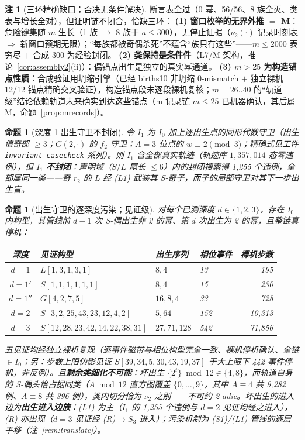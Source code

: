 \documentclass[11pt]{ctexart}
\newtheorem{proposition}[theorem]{命题}
\theoremstyle{definition}
\newtheorem{remark}[theorem]{注}
\newcommand{\vtwo}[1]{\nu_2(#1)}
\begin{document}
\begin{remark}[三环精确缺口；否决无条件解决]\label{rem:gaps}
断言表全过（0 幂、56/56、8 族全灭、类表与增长全对），但证明链不闭合，恰缺三环：
\textbf{(1) 窗口枚举的无界外推 $=$ M}：危险键集随 $m$ 生长（1 族 $\to$ 8 族于 $a\le300$），无停止证据（$\vtwo{\cdot}$-记录时刻表 $\Rightarrow$ 新窗口预期无限）；``每族都被奇偶杀死''不蕴含``族只有这些''——$m\le2000$ 表穷尽 $+$ 合成 300 为经验封闭。
\textbf{(2) 类保持是条件件}（L7/M-架构，推论~\ref{cor:assembly2}(ii)）：偶锚点出生是独立的真实幂通道。
\textbf{(3) $m>25$ 为构造锚点性质}：合成验证用坍缩引擎（已经 births10 非坍缩 0-mismatch $+$ 独立裸机 12/12 锚点精确交叉验证），构造锚点段未逐段裸机复核；$m=26..40$ 的``轨道级''结论依赖轨道未来确实到达这些锚点（m-记录链 $m\le25$ 已机器确认，其后属 M，命题~\ref{prop:mrecords}）。
\end{remark}

\begin{proposition}[深度 1 出生守卫不封闭]\label{prop:depth1}
令 $I_1$ 为 $I_0$ 加上逐出生点的同形代数守卫（出生值奇部 $\ge3$；$G(2,\cdot)$ 的 $f_2$ 守卫；$A=3$ 位点的 $w\equiv2\pmod3$；精确式见工件 \texttt{invariant-casecheck} 系列）。则 $I_1$ 含全部真实轨迹（轨迹库 $1{,}357{,}014$ 态零违例），但 $I_1$ \textbf{不封闭}：声明域（$S/L$ 尾长 $\le6$）内的封闭搜索得 1,255 个违例，全部属同一类——奇 $r_2$ 的 $L$ 经 (L1) 武装其 S-奇子，而子的局部守卫对其下一步出生盲。
\end{proposition}

\begin{proposition}[出生守卫的逐深度污染；见证级]\label{prop:cascade}
对每个已测深度 $d\in\{1,2,3\}$，存在 $I_0$ 内构型，其管线前 $d-1$ 次 S-偶出生非 2 的幂、第 $d$ 次出生为 2 的幂，且整链真停机：
\begin{center}
\begin{tabular}{clllr}
\toprule
深度 & 见证构型 & 出生序列 & 相位事件 & 裸机步数\\
\midrule
$d{=}1$ & $L[1,3,1,3,1]$ & $8,4$ & 13 & 195\\
$d{=}1'$ & $S[1,1,1,1,1,1]$ & $8,4$ & 15 & 230\\
$d{=}1''$ & $G[4,2,7,5]$ & $16,8,4$ & 33 & 728\\
$d{=}2$ & $S[3,2,25,43,23,12,4,2]$ & $5,64$ & 152 & 10,313\\
$d{=}3$ & $S[12,28,23,42,14,22,38,31]$ & $27,71,128$ & 542 & 71,856\\
\bottomrule
\end{tabular}
\end{center}
五见证均经独立裸机复现（逐事件磁带与相位构型完全一致、裸机停机确认、全链 $\in I_0$；另：步数上限伪影见证 $S[39,34,5,30,43,19,37]$ 于大上限下 442 事件停机，非反例）。且\textbf{剩余类细化不可能}：坏出生 $\{2^t\}\bmod12\in\{4,8\}$，而轨道自身的 S-偶头恰占据同类（$A\bmod12$ 直方图覆盖 $\{0,\dots,9\}$，其中 $A\equiv4$ 共 9,282 例、$A\equiv8$ 共 396 例），类内切分恰为 $\nu_2$ 之别——不可约 2-adic。坏出生的进入边为\textbf{出生进入边族}：(L1) 为主（$I_1$ 的 1,255 个违例与 $d=2$ 见证均经之进入），(R) 亦出现（$d=3$ 见证经 (R)$\to S_3$ 进入）；污染机制为 (S1)/(L1) 管线的逐层平移（注~\ref{rem:translate}）。
\end{proposition}
\end{document}
